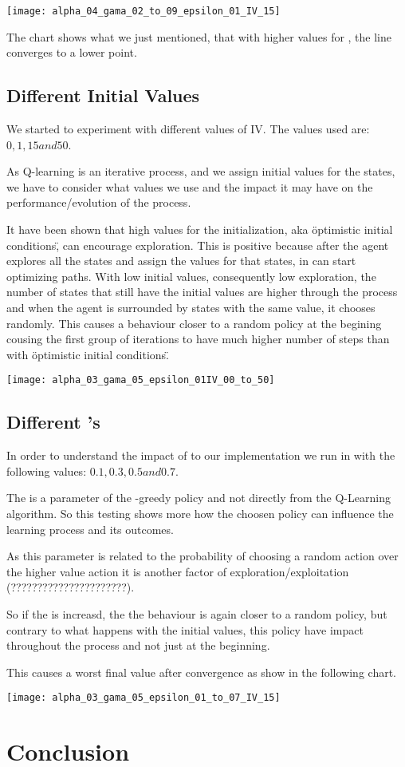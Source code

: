 \documentclass{article}
\begin{document}
\texttt{[image: alpha\_04\_gama\_02\_to\_09\_epsilon\_01\_IV\_15]}

The chart shows what we just mentioned, that with higher values for \gamma, the
line converges to a lower point.

\subsection{Different Initial Values}
We started to experiment with different values of IV. The values used are:
$0, 1, 15 and 50$. 

As Q-learning is an iterative process, and we assign initial values for the
states, we have to consider what values we use and the impact it may have on the
performance/evolution of the process.

It have been shown that high values for the initialization, aka \"optimistic
initial conditions\", can encourage exploration. This is positive because after
the agent explores all the states and assign the values for that states, in can
start optimizing paths.
With low initial values, consequently low exploration, the number of states that
still have the initial values are higher through the process and when the agent
is surrounded by states with the same value, it chooses randomly. This causes a
behaviour closer to a random policy at the begining cousing the first group of
iterations to have much higher number of steps than with \"optimistic
initial conditions\".

\texttt{[image: alpha\_03\_gama\_05\_epsilon\_01IV\_00\_to\_50]}

\subsection{Different \epsilon's}
In order to understand the impact of \epsilon to our implementation we run
in with the following values:
$0.1, 0.3, 0.5 and 0.7$.

The \epislon is a parameter of the \epsilon-greedy policy and not directly from
the Q-Learning algorithm. So this testing shows more how the choosen policy can
influence the learning process and its outcomes. 

As this parameter is related to the probability of choosing a random action over
the higher value action it is another factor of exploration/exploitation
(??????????????????????).

So if the \epsilon is increasd, the the behaviour is again closer to a random
policy, but contrary to what happens with the initial values, this policy have
impact throughout the process and not just at the beginning.

This causes a worst final value after convergence as show in the following
chart.

\texttt{[image: alpha\_03\_gama\_05\_epsilon\_01\_to\_07\_IV\_15]}

\section{Conclusion}
\end{document}
